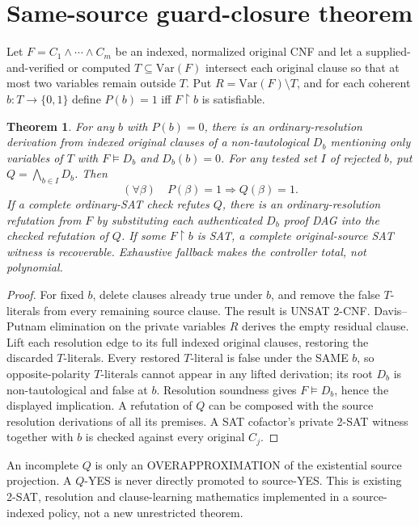\documentclass[11pt]{article}
\newtheorem{theorem}{Theorem}
\begin{document}
\section{Same-source guard-closure theorem}
Let $F=C_1\wedge\cdots\wedge C_m$ be an indexed, normalized original CNF and let a supplied-and-verified or computed $T\subseteq\mathrm{Var}(F)$ intersect each original clause so that at most two variables remain outside $T$. Put $R=\mathrm{Var}(F)\setminus T$, and for each coherent $b:T\rightarrow\{0,1\}$ define $P(b)=1$ iff $F\!\upharpoonright b$ is satisfiable.
\begin{theorem}
For any $b$ with $P(b)=0$, there is an ordinary-resolution derivation from indexed original clauses of a non-tautological $D_b$ mentioning only variables of $T$ with $F\models D_b$ and $D_b(b)=0$. For any tested set $I$ of rejected $b$, put $Q=\bigwedge_{b\in I}D_b$. Then
\[
(\forall \beta)\quad P(\beta)=1\Longrightarrow Q(\beta)=1.
\]
If a complete ordinary-SAT check refutes $Q$, there is an ordinary-resolution refutation from $F$ by substituting each authenticated $D_b$ proof DAG into the checked refutation of $Q$. If some $F\!\upharpoonright b$ is SAT, a complete original-source SAT witness is recoverable. Exhaustive fallback makes the controller total, not polynomial.
\end{theorem}
\begin{proof}
For fixed $b$, delete clauses already true under $b$, and remove the false $T$-literals from every remaining source clause. The result is UNSAT 2-CNF. Davis--Putnam elimination on the private variables $R$ derives the empty residual clause. Lift each resolution edge to its full indexed original clauses, restoring the discarded $T$-literals. Every restored $T$-literal is false under the SAME $b$, so opposite-polarity $T$-literals cannot appear in any lifted derivation; its root $D_b$ is non-tautological and false at $b$. Resolution soundness gives $F\models D_b$, hence the displayed implication. A refutation of $Q$ can be composed with the source resolution derivations of all its premises. A SAT cofactor's private 2-SAT witness together with $b$ is checked against every original $C_j$.
\end{proof}
An incomplete $Q$ is only an OVERAPPROXIMATION of the existential source projection. A $Q$-YES is never directly promoted to source-YES. This is existing 2-SAT, resolution and clause-learning mathematics implemented in a source-indexed policy, not a new unrestricted theorem.
\end{document}

